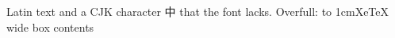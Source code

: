 \documentclass{article}
\begin{document}
Latin text and a CJK character 中 that the font lacks.
\undefinedinxetex
Overfull: \hbox to 1cm{XeTeX wide box contents}
\end{document}

